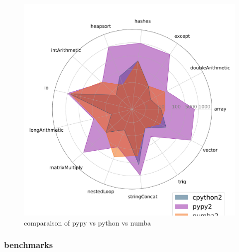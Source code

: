 \begin{figure}[thb]
    \centering
    \includegraphics[width=\linewidth]{imgs/tommti_compare__cpython2_pypy2_numba2}
    \caption{comparaison of pypy vs python vs numba }
    \label{fig:p2}
\end{figure}






\subsubsection{benchmarks}

